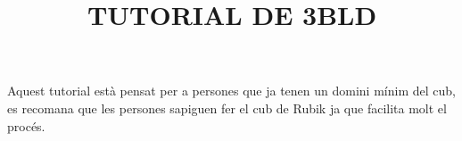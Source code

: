 \documentclass{article}
\title{\textbf{TUTORIAL DE 3BLD}}
\begin{document}
\thispagestyle{empty}
\maketitle
\newpage

\thispagestyle{empty}
\tableofcontents
\newpage

\thispagestyle{empty}
Aquest tutorial està pensat per a persones que ja tenen un domini mínim del cub, es recomana que les persones sapiguen fer el cub de Rubik ja que facilita molt el procés.


\newpage


\newpage


\newpage


\newpage


\newpage

\end{document}
